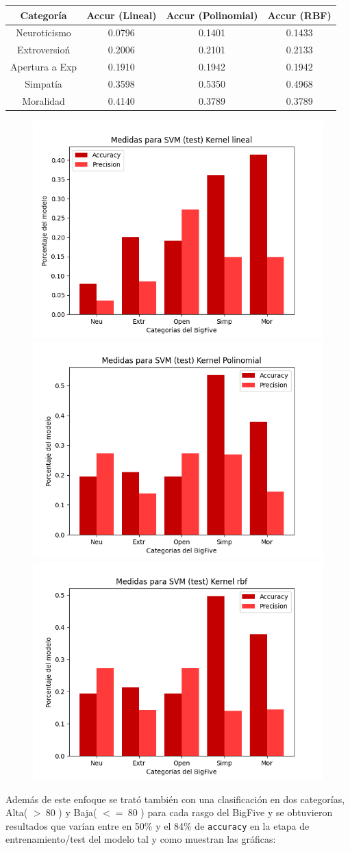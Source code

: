 \documentclass[10pt, a4paper]{article}
\begin{document}
            \begin{tabular}[h!]{|c|c|c|c|}

                \hline Categor\'ia & Accur (Lineal) & Accur (Polinomial) & Accur (RBF) \\  
                \hline Neuroticismo             & 0.0796 & 0.1401  &  0.1433\\
                \hline Extroversio\'n           & 0.2006 & 0.2101  &  0.2133\\
                \hline Apertura a Exp  & 0.1910 & 0.1942  &  0.1942\\
                \hline Simpat\'ia               & 0.3598 & 0.5350  &  0.4968\\
                \hline Moralidad                & 0.4140 & 0.3789  &  0.3789\\
                \hline
            \end{tabular}

            \begin{figure}[h!]
                \centering
                \includegraphics[width = 0.3\linewidth]{final_lineal10.png}
                \includegraphics[width = 0.3\linewidth]{final_polinomial10.png}
                \includegraphics[width = 0.3\linewidth]{final_rbf10.png}

            \end{figure}

            Adem\'as de este enfoque se trat\'o tambi\'en con una clasificaci\'on en dos categor\'ias, Alta( $>~ 80$ ) y Baja( $<= ~80$ ) para
            cada rasgo del BigFive y se obtuvieron resultados que var\'ian entre en 50\% y el 84\% de \texttt{accuracy} en la etapa 
            de entrenamiento/test del modelo tal y como muestran las gr\'aficas:\\ 
\end{document}
